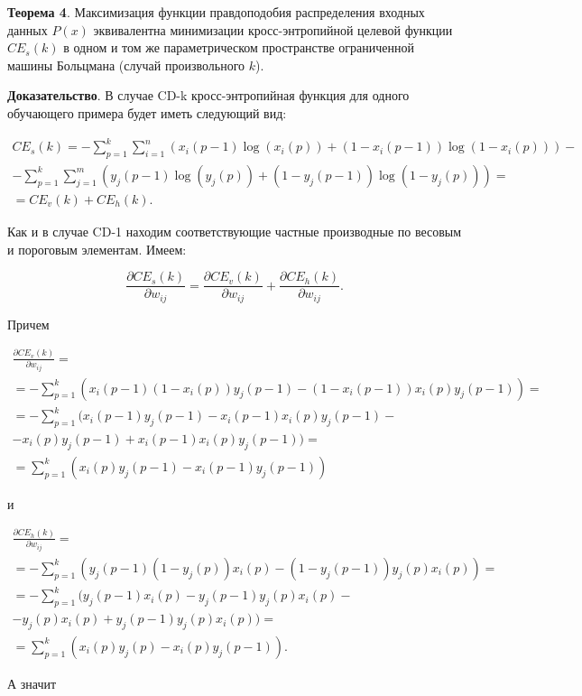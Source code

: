 \textbf{Теорема 4}. Максимизация функции правдоподобия распределения входных данных $P(x)$ эквивалентна минимизации кросс-энтропийной целевой функции $CE_s(k)$ в одном и том же параметрическом пространстве ограниченной машины Больцмана (случай произвольного $k$).

\textbf{Доказательство}. В случае CD-k кросс-энтропийная функция для одного обучающего примера будет иметь следующий вид:

\begin{multline}
	CE_s(k) = -\sum_{p=1}^k \sum_{i=1}^n (x_i(p-1)\log(x_i(p)) + (1-x_i(p-1))\log(1-x_i(p)))-\\-\sum_{p=1}^k \sum_{j=1}^m (y_j(p-1)\log (y_j(p))+(1-y_j(p-1))\log(1-y_j(p))) = \\ = CE_v(k) + CE_h(k).
\end{multline}

Как и в случае CD-1 находим соответствующие частные производные по весовым и пороговым элементам. Имеем:

\begin{equation*}
	\frac{\partial CE_s(k)}{\partial w_{ij}}= \frac{\partial CE_v(k)}{\partial w_{ij}} + \frac{\partial CE_h(k)}{\partial w_{ij}}.
\end{equation*}

Причем

\begin{multline*}
	\frac{\partial CE_v(k)}{\partial w_{ij}} = \\ = -\sum_{p=1}^k (x_i(p-1)(1-x_i(p))y_j(p-1)-(1-x_i(p-1))x_i(p)y_j(p-1))=\\=-\sum_{p=1}^k (x_i(p-1)y_j(p-1)-x_i(p-1)x_i(p)y_j(p-1)-\\-x_i(p)y_j(p-1)+x_i(p-1)x_i(p)y_j(p-1)) = \\ = \sum_{p=1}^{k} (x_i(p)y_j(p-1)-x_i(p-1)y_j(p-1))
\end{multline*}

и

\begin{multline*}
	\frac{\partial CE_h(k)}{\partial w_{ij}} = \\ = -\sum_{p=1}^k (y_j(p-1)(1-y_j(p))x_i(p)-(1-y_j(p-1))y_j(p)x_i(p)) = \\ = -\sum_{p=1}^{k} (y_j(p-1)x_i(p)-y_j(p-1)y_j(p)x_i(p)-\\-y_j(p)x_i(p)+y_j(p-1)y_j(p)x_i(p)) = \\ = \sum_{p=1}^{k} (x_i(p)y_j(p)-x_i(p)y_j(p-1)).
\end{multline*}

А значит

